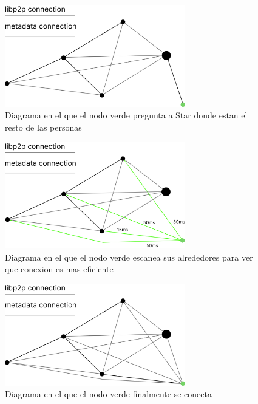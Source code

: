 \begin{figure}[h!]
    \centering
    \includegraphics[width=0.7\textwidth]{Figures/Green ask Star for instructions.png}
    \caption{Diagrama en el que el nodo verde pregunta a Star donde estan el resto de las personas}
    \label{fg:asking_star}
\end{figure}
\begin{figure}[h!]
    \centering
    \includegraphics[width=0.7\textwidth]{Figures/Green scans the other peers.png}
    \caption{Diagrama en el que el nodo verde escanea sus alrededores para ver que conexion es mas eficiente}
    \label{fg:scanning_area}
\end{figure}
\begin{figure}[h!]
    \centering
    \includegraphics[width=0.7\textwidth]{Figures/Green finally joins(1).png}
    \caption{Diagrama en el que el nodo verde finalmente se conecta}
    \label{fg:connecting}
\end{figure}
